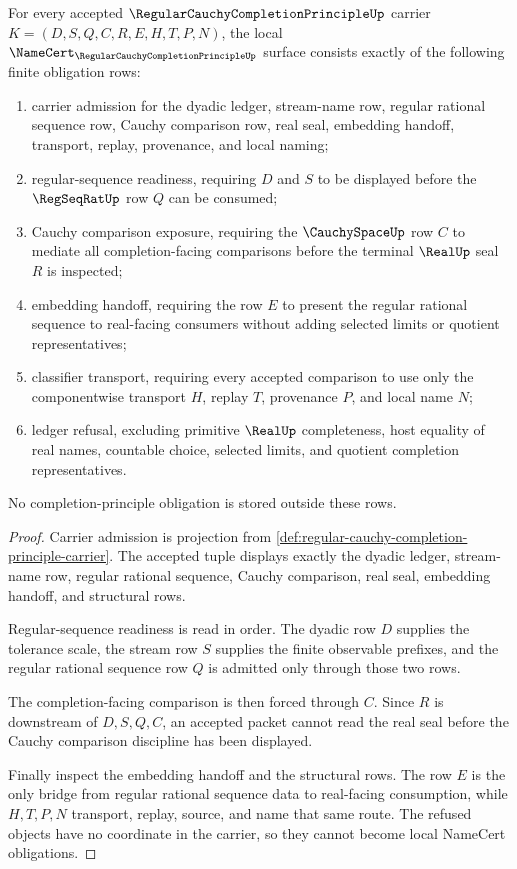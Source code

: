 \begin{theorem}
\label{thm:regular-cauchy-completion-principle-namecert-obligations}
For every accepted $\RegularCauchyCompletionPrincipleUp$ carrier $K=(D,S,Q,C,R,E,H,T,P,N)$, the local $\NameCert_{\RegularCauchyCompletionPrincipleUp}$ surface consists exactly of the following finite obligation rows:
\begin{enumerate}
\item carrier admission for the dyadic ledger, stream-name row, regular rational sequence row, Cauchy comparison row, real seal, embedding handoff, transport, replay, provenance, and local naming;
\item regular-sequence readiness, requiring $D$ and $S$ to be displayed before the $\RegSeqRatUp$ row $Q$ can be consumed;
\item Cauchy comparison exposure, requiring the $\CauchySpaceUp$ row $C$ to mediate all completion-facing comparisons before the terminal $\RealUp$ seal $R$ is inspected;
\item embedding handoff, requiring the row $E$ to present the regular rational sequence to real-facing consumers without adding selected limits or quotient representatives;
\item classifier transport, requiring every accepted comparison to use only the componentwise transport $H$, replay $T$, provenance $P$, and local name $N$;
\item ledger refusal, excluding primitive $\RealUp$ completeness, host equality of real names, countable choice, selected limits, and quotient completion representatives.
\end{enumerate}
No completion-principle obligation is stored outside these rows.
\end{theorem}
\begin{proof}
Carrier admission is projection from \autoref{def:regular-cauchy-completion-principle-carrier}. The accepted tuple displays exactly the dyadic ledger, stream-name row, regular rational sequence, Cauchy comparison, real seal, embedding handoff, and structural rows.

Regular-sequence readiness is read in order. The dyadic row $D$ supplies the tolerance scale, the stream row $S$ supplies the finite observable prefixes, and the regular rational sequence row $Q$ is admitted only through those two rows.

The completion-facing comparison is then forced through $C$. Since $R$ is downstream of $D,S,Q,C$, an accepted packet cannot read the real seal before the Cauchy comparison discipline has been displayed.

Finally inspect the embedding handoff and the structural rows. The row $E$ is the only bridge from regular rational sequence data to real-facing consumption, while $H,T,P,N$ transport, replay, source, and name that same route. The refused objects have no coordinate in the carrier, so they cannot become local NameCert obligations.
\end{proof}


